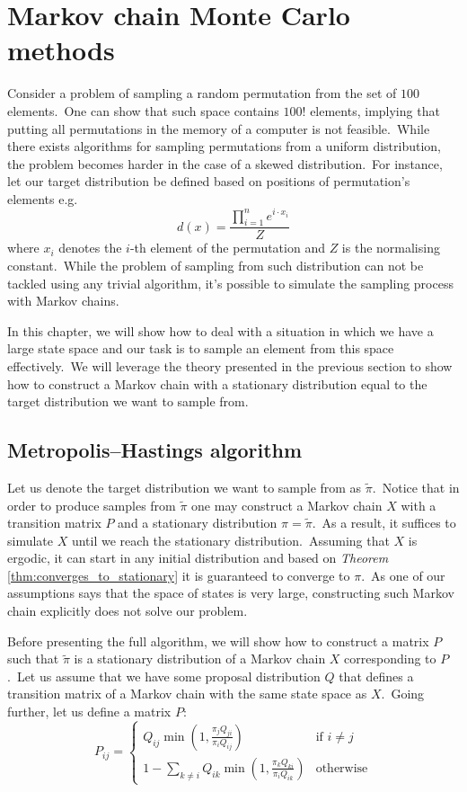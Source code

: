\documentclass[shortabstract, english, lic]{iithesis}
\newcommand\numberedchapter[1]{\setlength\topskip{3cm}\chapter{#1}\setlength\topskip{0cm}}
\theoremstyle{default_theorem_style}\newtheorem{theorem}{Theorem}
\theoremstyle{default_theorem_style}\newtheorem{definition}{Definition}
\begin{document}
\numberedchapter{Markov chain Monte Carlo methods}\label{chapter:mcmc}

Consider a problem of sampling a random permutation from the set of $100$ elements.\ One can show that such space
contains $100!$ elements, implying that putting all permutations in the memory of a computer is not feasible.\ While
there exists algorithms for sampling permutations from a uniform distribution, the problem becomes harder in the case of
a skewed distribution.\ For instance, let our target distribution be defined based on positions of permutation's
elements e.g.
$$
d(x) = \frac{\prod_{i = 1}^{n} e^{i \cdot x_i}}{Z}
$$
where $x_i$ denotes the $i$-th element of the permutation and $Z$ is the normalising constant.\ While the problem
of sampling from such distribution can not be tackled using any trivial algorithm, it's possible to simulate the
sampling process with Markov chains.\newline

\noindent In this chapter, we will show how to deal with a situation in which we have a large state space and our
task is to sample an element from this space effectively.\ We will leverage the theory presented in the previous
section to show how to construct a Markov chain with a stationary distribution equal to the target distribution we
want to sample from.

\section{Metropolis–Hastings algorithm}

Let us denote the target distribution we want to sample from as $\tilde{\pi}$.\ Notice that in order to produce samples
from $\tilde{\pi}$ one may construct a Markov chain $X$ with a transition matrix $P$ and a stationary distribution
$\pi = \tilde{\pi}$.\ As a result, it suffices to simulate $X$ until we reach the stationary distribution.\ Assuming
that $X$ is ergodic, it can start in any initial distribution and based on \textit{Theorem} \ref{thm:converges_to_stationary}
it is guaranteed to converge to $\pi$.\ As one of our assumptions says that the space of states is very large,
constructing such Markov chain explicitly does not solve our problem.\newline

\noindent Before presenting the full algorithm, we will show how to construct a matrix $P$ such that $\tilde{\pi}$ is a
stationary distribution of a Markov chain $X$ corresponding to $P$.\ Let us assume that we have some proposal
distribution $Q$ that defines a transition matrix of a Markov chain with the same state space as $X$.\ Going further,
let us define a matrix $P$:\newline
$$
P_{ij} =
\begin{cases}
  Q_{ij}\min{(1, \frac{\pi_j Q_{ji}}{\pi_i Q_{ij}})} &\text{if $i \ne j$}\\
  1 - \sum\limits_{k \ne i}Q_{ik} \min{(1, \frac{\pi_k Q_{ki}}{\pi_i Q_{ik}})} &\text{otherwise}
\end{cases}
$$
\end{document}

